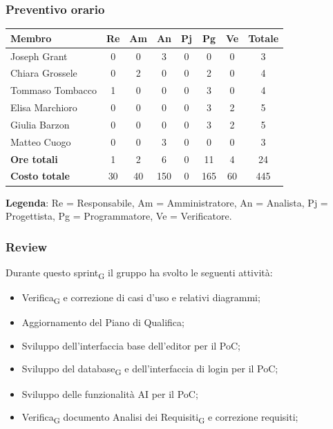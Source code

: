 \documentclass[11pt,a4paper]{article}
\newcommand{\gls}[1]{#1\textsubscript{G}}
\begin{document}
\subsubsection{Preventivo orario}
\begin{center}
    \begin{tabular}{|l|c|c|c|c|c|c|c|}
        \hline
        \textbf{Membro} & \textbf{Re} & \textbf{Am} & \textbf{An} & \textbf{Pj} & \textbf{Pg} & \textbf{Ve} & \textbf{Totale} \\
        \hline
        Joseph Grant & 0 & 0 & 3 & 0 & 0 & 0 & 3 \\
        \hline
        Chiara Grossele & 0 & 2 & 0 & 0 & 2 & 0 & 4 \\
        \hline
        Tommaso Tombacco & 1 & 0 & 0 & 0 & 3 & 0 & 4 \\
        \hline
        Elisa Marchioro & 0 & 0 & 0 & 0 & 3 & 2 & 5 \\
        \hline
        Giulia Barzon & 0 & 0 & 0 & 0 & 3 & 2 & 5 \\
        \hline
        Matteo Cuogo & 0 & 0 & 3 & 0 & 0 & 0 & 3 \\
        \hline
        \textbf{Ore totali} & 1 & 2 & 6 & 0 & 11 & 4 & 24 \\
        \hline
        \textbf{Costo totale} & 30 & 40 & 150 & 0 & 165 & 60 & 445 \\
        \hline
    \end{tabular}
\end{center}

\noindent \textbf{Legenda}: Re = Responsabile, Am = Amministratore, An = Analista, Pj = Progettista, Pg = Programmatore, Ve = Verificatore.

\subsubsection{Review}
Durante questo \gls{sprint} il gruppo ha svolto le seguenti attività:

\begin{itemize}
        \item \gls{Verifica} e correzione di casi d'uso e relativi diagrammi;
        \item Aggiornamento del Piano di Qualifica;
        \item Sviluppo dell'interfaccia base dell'editor per il PoC;
        \item Sviluppo del \gls{database} e dell'interfaccia di login per il PoC;
        \item Sviluppo delle funzionalità AI per il PoC;
        \item \gls{Verifica} documento \gls{Analisi dei Requisiti} e correzione requisiti;
    \end{itemize}
\end{document}
